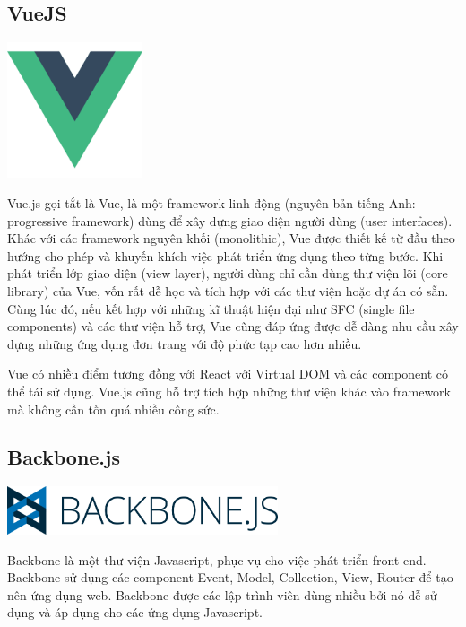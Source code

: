 \subsection{VueJS}
\begin{center}
  \captionsetup{type=figure}
  \includegraphics[width=4cm]{img/Vue-logo.png}
\end{center}

Vue.js gọi tắt là Vue, là một framework linh động (nguyên bản tiếng Anh: progressive framework) dùng để xây dựng giao diện người dùng (user interfaces). Khác với các framework nguyên khối (monolithic), Vue được thiết kế từ đầu theo hướng cho phép và khuyến khích việc phát triển ứng dụng theo từng bước. Khi phát triển lớp giao diện (view layer), người dùng chỉ cần dùng thư viện lõi (core library) của Vue, vốn rất dễ học và tích hợp với các thư viện hoặc dự án có sẵn. Cùng lúc đó, nếu kết hợp với những kĩ thuật hiện đại như SFC (single file components) và các thư viện hỗ trợ, Vue cũng đáp ứng được dễ dàng nhu cầu xây dựng những ứng dụng đơn trang với độ phức tạp cao hơn nhiều.

Vue có nhiều điểm tương đồng với React với Virtual DOM và các component có thể tái sử dụng. Vue.js cũng hỗ trợ tích hợp những thư viện khác vào framework mà không cần tốn quá nhiều công sức.
\subsection{Backbone.js}
\begin{center}
  \captionsetup{type=figure}
  \includegraphics[width=8cm]{img/backbone.png}
\end{center}

Backbone là một thư viện Javascript, phục vụ cho việc phát triển front-end. Backbone sử dụng các component Event, Model, Collection, View, Router để tạo nên ứng dụng web. Backbone được các lập trình viên dùng nhiều bởi nó dễ sử dụng và áp dụng cho các ứng dụng Javascript.


